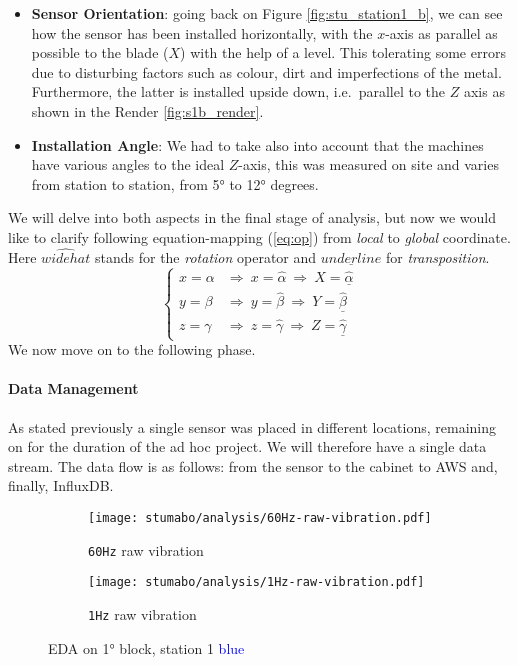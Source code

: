\begin{itemize}
    \item \textbf{Sensor Orientation}: 
    going back on Figure \ref{fig:stu_station1_b}, we can see how the sensor has been installed horizontally, with the $x$-axis as parallel as possible to the blade ($X$) with 
    the help of a level. 
    This tolerating some errors due to disturbing factors such as colour, dirt and imperfections of the metal.
    Furthermore, the latter is installed upside down, i.e.\ parallel to the $Z$ axis as shown in the Render \ref{fig:s1b_render}.
    \item \textbf{Installation Angle}:
    We had to take also into account that the machines have various angles to the ideal $Z$-axis, this was measured on site and varies from station to station, from 5° to 12° degrees.
\end{itemize}
We will delve into both aspects in the final stage of analysis, but now we would like to clarify following equation-mapping (\ref{eq:op}) from \textit{local} to \textit{global} coordinate.
Here $\widehat{widehat}$ stands for the \textit{rotation} operator and $\underline{underline}$ for \textit{transposition}. 
\begin{equation}
    \left\{ \begin{array}{cl}
        x = \alpha & \Rightarrow  \ x = \widehat{\alpha} \ \Rightarrow  \ X = \underline{\widehat{\alpha}} \\
        y = \beta & \Rightarrow  \ y = \widehat{\beta} \ \Rightarrow  \ Y = \underline{\widehat{\beta}} \\ 
        z = \gamma & \Rightarrow  \ z = \widehat{\gamma} \ \Rightarrow  \ Z = \underline{\widehat{\gamma}}
        \end{array} \right.
    \label{eq:op}
\end{equation}
We now move on to the following phase.

\paragraph{Data Management}
As stated previously a single sensor was placed in different locations, remaining on for the duration of the ad hoc project. We will therefore have a single data stream.
The data flow is as follows: from the sensor to the cabinet to AWS and, finally, InfluxDB.
\begin{figure}[ht]
    \begin{subfigure}{.495\textwidth}
        \texttt{[image: stumabo/analysis/60Hz-raw-vibration.pdf]}
        \caption{\texttt{60Hz} raw vibration}
        \label{fig:stu_60Hz_raw}
    \end{subfigure}
    \begin{subfigure}{.495\textwidth}
        \texttt{[image: stumabo/analysis/1Hz-raw-vibration.pdf]}
        \caption{\texttt{1Hz} raw vibration}
        \label{fig:stu_1Hz_raw}
    \end{subfigure}
    \caption{\acl{EDA} on 1° block, station 1 \textcolor{blue}{blue}}
    \label{fig:stu_2_raw_data}
\end{figure}

